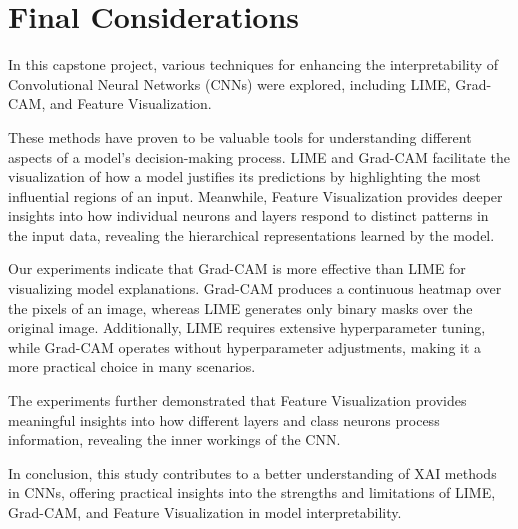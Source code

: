 \chapter{Final Considerations}

In this capstone project, various techniques for enhancing the interpretability of Convolutional Neural Networks (CNNs) were explored, including LIME, Grad-CAM, and Feature Visualization.

These methods have proven to be valuable tools for understanding different aspects of a model's decision-making process. LIME and Grad-CAM facilitate the visualization of how a model justifies its predictions by highlighting the most influential regions of an input. Meanwhile, Feature Visualization provides deeper insights into how individual neurons and layers respond to distinct patterns in the input data, revealing the hierarchical representations learned by the model.

Our experiments indicate that Grad-CAM is more effective than LIME for visualizing model explanations. Grad-CAM produces a continuous heatmap over the pixels of an image, whereas LIME generates only binary masks over the original image. Additionally, LIME requires extensive hyperparameter tuning, while Grad-CAM operates without hyperparameter adjustments, making it a more practical choice in many scenarios.

The experiments further demonstrated that Feature Visualization provides meaningful insights into how different layers and class neurons process information, revealing the inner workings of the CNN.

In conclusion, this study contributes to a better understanding of XAI methods in CNNs, offering practical insights into the strengths and limitations of LIME, Grad-CAM, and Feature Visualization in model interpretability.